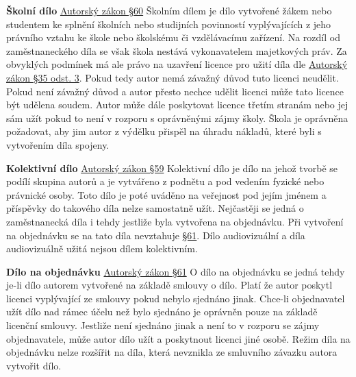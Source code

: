 \vspace{0.3cm}
\textbf{Školní dílo} \href{https://www.zakonyprolidi.cz/cs/2000-121#p60}{Autorský zákon §60}
Školním dílem je dílo vytvořené žákem nebo studentem ke splnění školních nebo studijních povinností vyplývajících z jeho právního vztahu ke škole nebo školskému či vzdělávacímu zařízení. Na rozdíl od zaměstnaneckého díla se však škola nestává vykonavatelem majetkových práv. Za obvyklých podmínek má ale právo na uzavření licence pro užití díla dle \href{https://www.zakonyprolidi.cz/cs/2000-121#p35-3}{Autorský zákon §35 odst. 3}. Pokud tedy autor nemá závažný důvod tuto licenci neudělit. Pokud není závažný důvod a autor přesto nechce udělit licenci může tato licence být udělena soudem. Autor může dále poskytovat licence třetím stranám nebo jej sám užít pokud to není v rozporu s oprávněnými zájmy školy. Škola je oprávněna požadovat, aby jim autor z výdělku přispěl na úhradu nákladů, které byli s vytvořením díla spojeny. 

\vspace{0.3cm}
\textbf{Kolektivní dílo} \href{https://www.zakonyprolidi.cz/cs/2000-121#p59}{Autorský zákon §59}
Kolektivní dílo je dílo na jehož tvorbě se podílí skupina autorů a je vytvářeno z podnětu a pod vedením fyzické nebo právnické osoby. Toto dílo je poté uváděno na veřejnost pod jejím jménem a příspěvky do takového díla nelze samostatně užít. Nejčastěji se jedná o zaměstnanecká díla i tehdy jestliže byla vytvořena na objednávku. Při vytvoření na objednávku se na tato díla nevztahuje \href{https://www.zakonyprolidi.cz/cs/2000-121#p61}{ §61}. Dílo audiovizuální a díla audiovizuálně užitá nejsou dílem kolektivním.

\vspace{0.3cm}
\textbf{Dílo na objednávku} \href{https://www.zakonyprolidi.cz/cs/2000-121#p61}{Autorský zákon §61}
O dílo na objednávku se jedná tehdy je-li dílo autorem vytvořené na základě smlouvy o dílo. Platí že autor poskytl licenci vyplývající ze smlouvy pokud nebylo sjednáno jinak. Chce-li objednavatel užít dílo nad rámec účelu než bylo sjednáno je oprávněn pouze na základě licenční smlouvy. Jestliže není sjednáno jinak a není to v rozporu se zájmy objednavatele, může autor dílo užít a poskytnout licenci jiné osobě. Režim díla na objednávku nelze rozšířit na díla, která nevznikla ze smluvního závazku autora vytvořit dílo.











